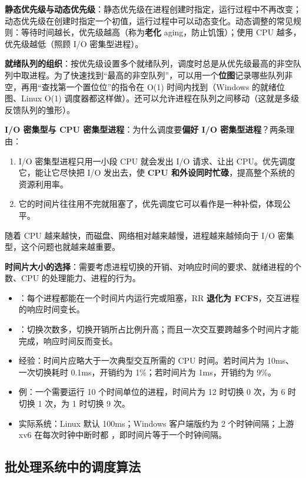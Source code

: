 \textbf{静态优先级与动态优先级}：静态优先级在进程创建时指定，运行过程中不再改变；动态优先级在创建时指定一个初值，运行过程中可以动态变化。动态调整的常见规则：等待时间越长，优先级越高（称为\textbf{老化} aging，防止饥饿）；使用 CPU 越多，优先级越低（照顾 I/O 密集型进程）。

\textbf{就绪队列的组织}：按优先级设置多个就绪队列，调度时总是从优先级最高的非空队列中取进程。为了快速找到“最高的非空队列”，可以用一个\textbf{位图}记录哪些队列非空，再用“查找第一个置位位”的指令在 O(1) 时间内找到（Windows 的就绪位图、Linux O(1) 调度器都这样做）。还可以允许进程在队列之间移动（这就是多级反馈队列的雏形）。

\textbf{I/O 密集型与 CPU 密集型进程}：为什么调度要\textbf{偏好 I/O 密集型进程}？\bk 两条理由：
\begin{enumerate}
    \item I/O 密集型进程只用一小段 CPU 就会发出 I/O 请求、让出 CPU。优先调度它，能让它尽快把 I/O 发出去，使 \textbf{CPU 和外设同时忙碌}，提高整个系统的资源利用率。
    \item 它的时间片往往用不完就阻塞了，优先调度它可以看作是一种补偿，体现公平。
\end{enumerate}
随着 CPU 越来越快，而磁盘、网络相对越来越慢，进程越来越倾向于 I/O 密集型，这个问题也就越来越重要。

\textbf{时间片大小的选择}：需要考虑进程切换的开销、对响应时间的要求、就绪进程的个数、CPU 的处理能力、进程的行为。
\begin{itemize}
    \item {}：每个进程都能在一个时间片内运行完或阻塞，RR \textbf{退化为 FCFS}，交互进程的响应时间变长。
    \item {}：切换次数多，切换开销所占比例升高；而且一次交互要跨越多个时间片才能完成，响应时间反而变长。
    \item 经验：时间片应略大于一次典型交互所需的 CPU 时间。若时间片为 10ms、一次切换耗时 0.1ms，开销约为 1\%；若时间片为 1ms，开销约为 9\%。
    \item 例：一个需要运行 10 个时间单位的进程，时间片为 12 时切换 0 次，为 6 时切换 1 次，为 1 时切换 9 次。
    \item 实际系统：Linux  默认 100ms；Windows 客户端版约为 2 个时钟间隔；上游 xv6 在每次时钟中断时都 ，即时间片等于一个时钟间隔。
\end{itemize}

\subsection{批处理系统中的调度算法}

